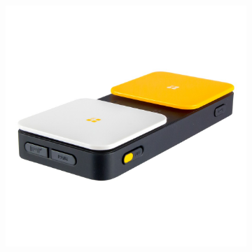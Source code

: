             \begin{figure}[H]
				\centering
				\begin{subfigure}{.33\textwidth}
  					\centering
  					\includegraphics[width=.8\linewidth]{images/buttonsIPad.jpg}
  					\caption{\cite{ablenet:iPad}}
                    

\end{subfigure}
\end{figure}
